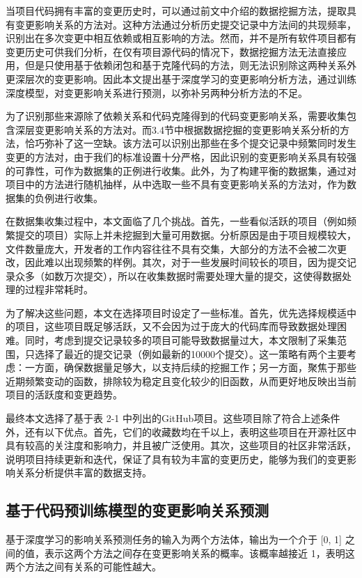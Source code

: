 当项目代码拥有丰富的变更历史时，可以通过前文中介绍的数据挖掘方法，提取具有变更影响关系的方法对。这种方法通过分析历史提交记录中方法间的共现频率，识别出在多次变更中相互依赖或相互影响的方法。然而，并不是所有软件项目都有变更历史可供我们分析，在仅有项目源代码的情况下，数据挖掘方法无法直接应用，但是只使用基于依赖闭包和基于克隆代码的方法，则无法识别除这两种关系外更深层次的变更影响。因此本文提出基于深度学习的变更影响分析方法，通过训练深度模型，对变更影响关系进行预测，以弥补另两种分析方法的不足。

为了识别那些来源除了依赖关系和代码克隆得到的代码变更影响关系，需要收集包含深层变更影响关系的方法对。而3.4节中根据数据挖掘的变更影响关系分析的方法，恰巧弥补了这一空缺。该方法可以识别出那些在多个提交记录中频繁同时发生变更的方法对，由于我们的标准设置十分严格，因此识别的变更影响关系具有较强的可靠性，可作为数据集的正例进行收集。此外，为了构建平衡的数据集，通过对项目中的方法进行随机抽样，从中选取一些不具有变更影响关系的方法对，作为数据集的负例进行收集。

在数据集收集过程中，本文面临了几个挑战。首先，一些看似活跃的项目（例如频繁提交的项目）实际上并未挖掘到大量可用数据。分析原因是由于项目规模较大，文件数量庞大，开发者的工作内容往往不具有交集，大部分的方法不会被二次更改，因此难以出现频繁的样例。其次，对于一些发展时间较长的项目，因为提交记录众多（如数万次提交），所以在收集数据时需要处理大量的提交，这使得数据处理的过程非常耗时。

为了解决这些问题，本文在选择项目时设定了一些标准。首先，优先选择规模适中的项目，这些项目既足够活跃，又不会因为过于庞大的代码库而导致数据处理困难。同时，考虑到提交记录较多的项目可能导致数据量过大，本文限制了采集范围，只选择了最近的提交记录（例如最新的10000个提交）。这一策略有两个主要考虑：一方面，确保数据量足够大，以支持后续的挖掘工作；另一方面，聚焦于那些近期频繁变动的函数，排除较为稳定且变化较少的旧函数，从而更好地反映出当前项目的活跃度和变更趋势。

最终本文选择了基于表 2-1 中列出的GitHub项目。这些项目除了符合上述条件外，还有以下优点。首先，它们的收藏数均在千以上，表明这些项目在开源社区中具有较高的关注度和影响力，并且被广泛使用。其次，这些项目的社区非常活跃，说明项目持续更新和迭代，保证了具有较为丰富的变更历史，能够为我们的变更影响关系分析提供丰富的数据支持。

\subsection{基于代码预训练模型的变更影响关系预测}

基于深度学习的影响关系预测任务的输入为两个方法体，输出为一个介于 [0, 1] 之间的值，表示这两个方法之间存在变更影响关系的概率。该概率越接近 1，表明这两个方法之间有关系的可能性越大。

